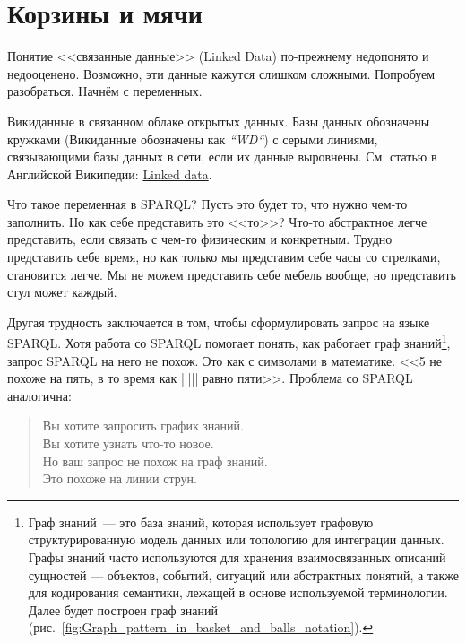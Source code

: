 \chapter{Корзины и мячи}
\label{ch:BucketsAndBalls}


Понятие <<связанные данные>> (Linked Data) по-прежнему недопонято и недооценено. Возможно, эти данные кажутся слишком сложными. 
Попробуем разобраться. Начнём с переменных.

\begin{marginfigure}[0cm]
	{
		\setlength{\fboxsep}{0pt}%
		\setlength{\fboxrule}{1pt}%
	}
    \caption[Викиданные в связанном облаке открытых данных]{Викиданные в связанном облаке открытых данных. Базы данных обозначены кружками (Викиданные обозначены как \textit{``WD``}) с серыми линиями, связывающими базы данных в сети, если их данные выровнены. См. статью в Английской Википедии: \href{https://en.wikipedia.org/wiki/Linked_data}{Linked data}.}
	\label{fig:Wikidata_in_linked_open_data}
\end{marginfigure}

Что такое переменная в SPARQL? Пусть это будет то, что нужно чем-то заполнить. Но как себе представить это <<то>>? Что-то абстрактное легче представить, если связать с чем-то физическим и конкретным. Трудно представить себе время, но как только мы представим себе часы со стрелками, становится легче. Мы не можем представить себе мебель вообще, но представить стул может каждый.

Другая трудность заключается в том, чтобы сформулировать запрос на языке SPARQL. Хотя работа со SPARQL помогает понять, как работает граф знаний\footnote[][12pt]{Граф знаний~--- это база знаний, которая использует графовую структурированную модель данных или топологию для интеграции данных. Графы знаний часто используются для хранения взаимосвязанных описаний сущностей — объектов, событий, ситуаций или абстрактных понятий, а также для кодирования семантики, лежащей в основе используемой терминологии. Далее будет построен граф знаний (рис.~\ref{fig:Graph_pattern_in_basket_and_balls_notation}).}, запрос SPARQL на него не похож. Это как с символами в математике. <<5 не похоже на пять, в то время как ||||| равно пяти>>. Проблема со SPARQL аналогична:

\begin{quote}
Вы хотите запросить график знаний.\\
Вы хотите узнать что-то новое.\\
Но ваш запрос не похож на граф знаний.\\
Это похоже на линии струн.\\
\end{quote}


